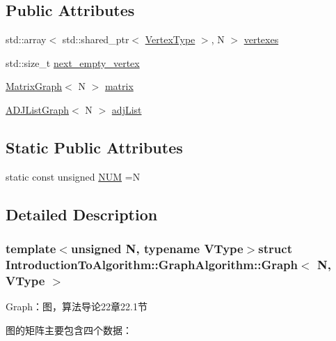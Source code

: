 \subsection*{Public Attributes}
\begin{DoxyCompactItemize}
\item 
std\+::array$<$ std\+::shared\+\_\+ptr$<$ \hyperlink{struct_introduction_to_algorithm_1_1_graph_algorithm_1_1_graph_a95fc613ee7f50f11c84d56c19dc6d321}{Vertex\+Type} $>$, N $>$ \hyperlink{struct_introduction_to_algorithm_1_1_graph_algorithm_1_1_graph_aea254564996a6a172f001ebf7f3c5f65}{vertexes}
\item 
std\+::size\+\_\+t \hyperlink{struct_introduction_to_algorithm_1_1_graph_algorithm_1_1_graph_a07a8f2eafc8175787a6ce1f26f1252d0}{next\+\_\+empty\+\_\+vertex}
\item 
\hyperlink{struct_introduction_to_algorithm_1_1_graph_algorithm_1_1_matrix_graph}{Matrix\+Graph}$<$ N $>$ \hyperlink{struct_introduction_to_algorithm_1_1_graph_algorithm_1_1_graph_a498323460ec613f12e1039afdca6c10a}{matrix}
\item 
\hyperlink{struct_introduction_to_algorithm_1_1_graph_algorithm_1_1_a_d_j_list_graph}{A\+D\+J\+List\+Graph}$<$ N $>$ \hyperlink{struct_introduction_to_algorithm_1_1_graph_algorithm_1_1_graph_a4442db9dd1bbb7fe543353df4fa1ba9f}{adj\+List}
\end{DoxyCompactItemize}
\subsection*{Static Public Attributes}
\begin{DoxyCompactItemize}
\item 
static const unsigned \hyperlink{struct_introduction_to_algorithm_1_1_graph_algorithm_1_1_graph_aba53db2c8cade306553fc1e03f138aa2}{N\+U\+M} =N
\end{DoxyCompactItemize}


\subsection{Detailed Description}
\subsubsection*{template$<$unsigned N, typename V\+Type$>$struct Introduction\+To\+Algorithm\+::\+Graph\+Algorithm\+::\+Graph$<$ N, V\+Type $>$}

Graph：图，算法导论22章22.1节 

图的矩阵主要包含四个数据：


